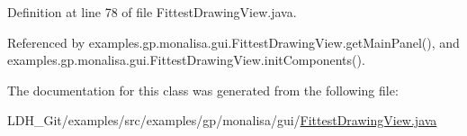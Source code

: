 Definition at line 78 of file Fittest\-Drawing\-View.\-java.



Referenced by examples.\-gp.\-monalisa.\-gui.\-Fittest\-Drawing\-View.\-get\-Main\-Panel(), and examples.\-gp.\-monalisa.\-gui.\-Fittest\-Drawing\-View.\-init\-Components().



The documentation for this class was generated from the following file\-:\begin{DoxyCompactItemize}
\item 
L\-D\-H\-\_\-\-Git/examples/src/examples/gp/monalisa/gui/\hyperlink{gp_2monalisa_2gui_2_fittest_drawing_view_8java}{Fittest\-Drawing\-View.\-java}\end{DoxyCompactItemize}
